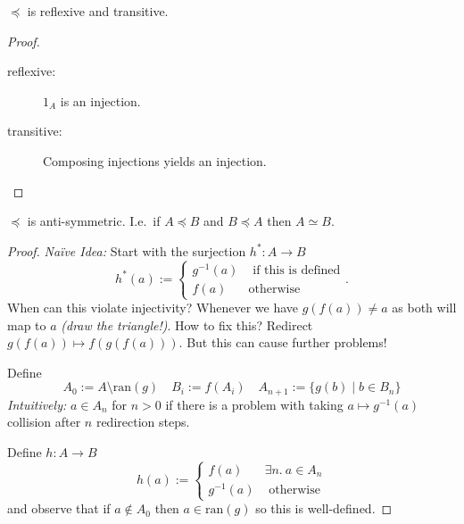 \documentclass{whrartcl}
\newcommand{\ran}{\text{ran}}
\begin{document}
\begin{lemma}
  $\preceq$ is reflexive and transitive.
\end{lemma}
\begin{proof}
  \
  \begin{description}
  \item[reflexive:] $1_A$ is an injection.
  \item[transitive:] Composing injections yields an injection.
  \end{description}
\end{proof}

\begin{theorem}
  $\preceq$ is anti-symmetric. I.e.\ if $A \preceq B$ and $B \preceq A$ then $A \simeq B$.
\end{theorem}
\begin{proof}
  \emph{Na\"ive Idea:} Start with the surjection $h^* : A \to B$
  \[
    h^*(a) :=
    \begin{cases}
      g^{-1}(a) & \text{ if this is defined} \\
      f(a) & \text{otherwise}
    \end{cases}.
  \]
  When can this violate injectivity? Whenever we have $g(f(a)) \neq a$ as both
  will map to $a$ \emph{(draw the triangle!)}. How to fix this? Redirect
  $g(f(a)) \mapsto f(g(f(a)))$. But this can cause further problems!

  Define
  \[
    A_0 := A \setminus \ran(g) \quad B_i := f(A_i) \quad A_{n + 1} := \{g(b)
    \mid b \in B_n\}
  \]
  \emph{Intuitively:} $a \in A_n$ for $n > 0$ if there is a problem with taking
  $a \mapsto g^{-1}(a)$ collision after $n$ redirection steps.

  Define $h : A \to B$
  \[
    h(a) :=
    \begin{cases}
      f(a) & \exists n.~a \in A_n \\
      g^{-1}(a) & \text{ otherwise}
    \end{cases}
  \]
  and observe that if $a \not\in A_0$ then $a \in \ran(g)$ so this is well-defined.


\end{proof}
\end{document}
